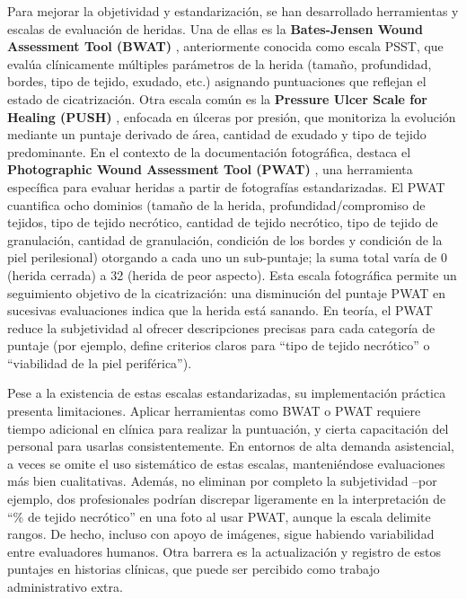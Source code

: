 Para mejorar la objetividad y estandarización, se han desarrollado herramientas y escalas de evaluación de heridas. Una de ellas es la \textbf{Bates-Jensen Wound Assessment Tool (BWAT)} \cite{harris2010bates}, anteriormente conocida como escala PSST, que evalúa clínicamente múltiples parámetros de la herida (tamaño, profundidad, bordes, tipo de tejido, exudado, etc.) asignando puntuaciones que reflejan el estado de cicatrización. Otra escala común es la \textbf{Pressure Ulcer Scale for Healing (PUSH)} \cite{stotts2001instrument}, enfocada en úlceras por presión, que monitoriza la evolución mediante un puntaje derivado de área, cantidad de exudado y tipo de tejido predominante. En el contexto de la documentación fotográfica, destaca el \textbf{Photographic Wound Assessment Tool (PWAT)} \cite{Curti2024}, una herramienta específica para evaluar heridas a partir de fotografías estandarizadas. El PWAT cuantifica ocho dominios (tamaño de la herida, profundidad/compromiso de tejidos, tipo de tejido necrótico, cantidad de tejido necrótico, tipo de tejido de granulación, cantidad de granulación, condición de los bordes y condición de la piel perilesional) otorgando a cada uno un sub-puntaje; la suma total varía de 0 (herida cerrada) a 32 (herida de peor aspecto). Esta escala fotográfica permite un seguimiento objetivo de la cicatrización: una disminución del puntaje PWAT en sucesivas evaluaciones indica que la herida está sanando. En teoría, el PWAT reduce la subjetividad al ofrecer descripciones precisas para cada categoría de puntaje (por ejemplo, define criterios claros para “tipo de tejido necrótico” o “viabilidad de la piel periférica”).

Pese a la existencia de estas escalas estandarizadas, su implementación práctica presenta limitaciones. Aplicar herramientas como BWAT o PWAT requiere tiempo adicional en clínica para realizar la puntuación, y cierta capacitación del personal para usarlas consistentemente. En entornos de alta demanda asistencial, a veces se omite el uso sistemático de estas escalas, manteniéndose evaluaciones más bien cualitativas. Además, no eliminan por completo la subjetividad –por ejemplo, dos profesionales podrían discrepar ligeramente en la interpretación de “\% de tejido necrótico” en una foto al usar PWAT, aunque la escala delimite rangos. De hecho, incluso con apoyo de imágenes, sigue habiendo variabilidad entre evaluadores humanos. Otra barrera es la actualización y registro de estos puntajes en historias clínicas, que puede ser percibido como trabajo administrativo extra.

